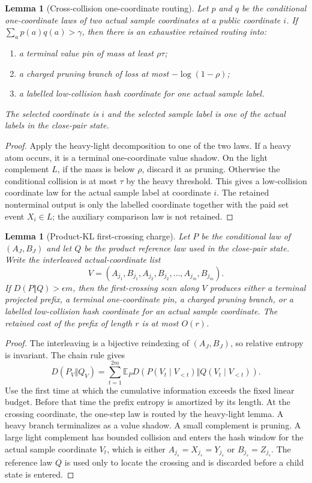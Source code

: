 \documentclass[11pt]{article}
\newtheorem{lemma}[theorem]{Lemma}
\theoremstyle{remark}
\newcommand{\E}{\mathbb E}
\begin{document}
\begin{lemma}[Cross-collision one-coordinate routing]\label{lem:app-cross-collision}
Let $p$ and $q$ be the conditional one-coordinate laws of two actual sample coordinates at a public coordinate $i$.  If $\sum_a p(a)q(a)>\gamma$, then there is an exhaustive retained routing into:
\begin{enumerate}[label=\textup{(\roman*)}]
\item a terminal value pin of mass at least $\rho\tau$;
\item a charged pruning branch of loss at most $-\log(1-\rho)$;
\item a labelled low-collision hash coordinate for one actual sample label.
\end{enumerate}
The selected coordinate is $i$ and the selected sample label is one of the actual labels in the close-pair state.
\end{lemma}

\begin{proof}
Apply the heavy-light decomposition to one of the two laws.  If a heavy atom occurs, it is a terminal one-coordinate value shadow.  On the light complement $L$, if the mass is below $\rho$, discard it as pruning.  Otherwise the conditional collision is at most $\tau$ by the heavy threshold.  This gives a low-collision coordinate law for the actual sample label at coordinate $i$.  The retained nonterminal output is only the labelled coordinate together with the paid set event $X_i\in L$; the auxiliary comparison law is not retained.
\end{proof}

\begin{lemma}[Product-KL first-crossing charge]\label{lem:app-kl-first-crossing}
Let $P$ be the conditional law of $(A_J,B_J)$ and let $Q$ be the product reference law used in the close-pair state.  Write the interleaved actual-coordinate list
\[
        V=(A_{j_1},B_{j_1},A_{j_2},B_{j_2},\ldots,A_{j_m},B_{j_m}).
\]
If $D(P\Vert Q)>\epsilon m$, then the first-crossing scan along $V$ produces either a terminal projected prefix, a terminal one-coordinate pin, a charged pruning branch, or a labelled low-collision hash coordinate for an actual sample coordinate.  The retained cost of the prefix of length $r$ is at most $O(r)$.
\end{lemma}

\begin{proof}
The interleaving is a bijective reindexing of $(A_J,B_J)$, so relative entropy is invariant.  The chain rule gives
\[
        D(P_V\Vert Q_V)=\sum_{t=1}^{2m}\E_P D(P(V_t\mid V_{<t})\Vert Q(V_t\mid V_{<t})).
\]
Use the first time at which the cumulative information exceeds the fixed linear budget.  Before that time the prefix entropy is amortized by its length.  At the crossing coordinate, the one-step law is routed by the heavy-light lemma.  A heavy branch terminalizes as a value shadow.  A small complement is pruning.  A large light complement has bounded collision and enters the hash window for the actual sample coordinate $V_t$, which is either $A_{j_s}=X_{j_s}=Y_{j_s}$ or $B_{j_s}=Z_{j_s}$.  The reference law $Q$ is used only to locate the crossing and is discarded before a child state is entered.
\end{proof}
\end{document}
